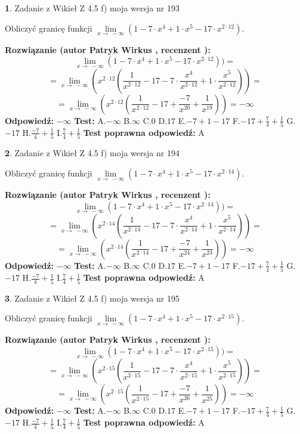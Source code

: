 \documentclass[12pt, a4paper]{article}
\theoremstyle{definition} %
\newtheorem{zad}{}
\newcommand{\zadStart}[1]{\begin{zad}#1\newline}
\newcommand{\zadStop}{\end{zad}}
\newcommand{\rozwStart}[2]{\noindent \textbf{Rozwiązanie (autor #1 , recenzent #2): }\newline}
\newcommand{\rozwStop}{\newline}
\newcommand{\odpStart}{\noindent \textbf{Odpowiedź:}\newline}
\newcommand{\odpStop}{\newline}
\newcommand{\testStart}{\noindent \textbf{Test:}\newline}
\newcommand{\testStop}{\newline}
\newcommand{\kluczStart}{\noindent \textbf{Test poprawna odpowiedź:}\newline}
\newcommand{\kluczStop}{\newline}
\begin{document}
\zadStart{Zadanie z Wikieł Z 4.5 f) moja wersja nr 193}



Obliczyć granicę funkcji  $\lim\limits_{x\to\ -\infty}(1 - 7 \cdot x^{4}+1 \cdot x^{5}- 17 \cdot x^{2\cdot12})$.
\zadStop
\rozwStart{Patryk Wirkus}{}
$$\lim\limits_{x\to\ -\infty}(1 - 7 \cdot x^{4}+1 \cdot x^{5}- 17 \cdot x^{2\cdot12}))=$$
$$=\lim\limits_{x\to\ -\infty}(x^{2\cdot12}(\frac{1}{x^{2\cdot12}}-17 -7 \cdot \frac{x^{4}}{x^{2\cdot12}}+1 \cdot \frac{x^{5}}{x^{2\cdot12}}))=$$
$$=\lim\limits_{x\to\ -\infty}(x^{2\cdot12}(\frac{1}{x^{2\cdot12}}-17 + \frac{-7}{x^{20}}+ \frac{1}{x^{19}}))=-\infty$$
\rozwStop
\odpStart
$-\infty$
\odpStop
\testStart
A.$-\infty$ B.$\infty$ C.$0$ D.$17$ E.$-7 + 1 - 17$
F.$-17+\frac{7}{4}+\frac{1}{5}$ G.$-17$
H.$\frac{-7}{4}+\frac{1}{5}$
I.$\frac{7}{4}+\frac{1}{5}$
\testStop
\kluczStart
A
\kluczStop



\zadStart{Zadanie z Wikieł Z 4.5 f) moja wersja nr 194}



Obliczyć granicę funkcji  $\lim\limits_{x\to\ -\infty}(1 - 7 \cdot x^{4}+1 \cdot x^{5}- 17 \cdot x^{2\cdot14})$.
\zadStop
\rozwStart{Patryk Wirkus}{}
$$\lim\limits_{x\to\ -\infty}(1 - 7 \cdot x^{4}+1 \cdot x^{5}- 17 \cdot x^{2\cdot14}))=$$
$$=\lim\limits_{x\to\ -\infty}(x^{2\cdot14}(\frac{1}{x^{2\cdot14}}-17 -7 \cdot \frac{x^{4}}{x^{2\cdot14}}+1 \cdot \frac{x^{5}}{x^{2\cdot14}}))=$$
$$=\lim\limits_{x\to\ -\infty}(x^{2\cdot14}(\frac{1}{x^{2\cdot14}}-17 + \frac{-7}{x^{24}}+ \frac{1}{x^{23}}))=-\infty$$
\rozwStop
\odpStart
$-\infty$
\odpStop
\testStart
A.$-\infty$ B.$\infty$ C.$0$ D.$17$ E.$-7 + 1 - 17$
F.$-17+\frac{7}{4}+\frac{1}{5}$ G.$-17$
H.$\frac{-7}{4}+\frac{1}{5}$
I.$\frac{7}{4}+\frac{1}{5}$
\testStop
\kluczStart
A
\kluczStop



\zadStart{Zadanie z Wikieł Z 4.5 f) moja wersja nr 195}



Obliczyć granicę funkcji  $\lim\limits_{x\to\ -\infty}(1 - 7 \cdot x^{4}+1 \cdot x^{5}- 17 \cdot x^{2\cdot15})$.
\zadStop
\rozwStart{Patryk Wirkus}{}
$$\lim\limits_{x\to\ -\infty}(1 - 7 \cdot x^{4}+1 \cdot x^{5}- 17 \cdot x^{2\cdot15}))=$$
$$=\lim\limits_{x\to\ -\infty}(x^{2\cdot15}(\frac{1}{x^{2\cdot15}}-17 -7 \cdot \frac{x^{4}}{x^{2\cdot15}}+1 \cdot \frac{x^{5}}{x^{2\cdot15}}))=$$
$$=\lim\limits_{x\to\ -\infty}(x^{2\cdot15}(\frac{1}{x^{2\cdot15}}-17 + \frac{-7}{x^{26}}+ \frac{1}{x^{25}}))=-\infty$$
\rozwStop
\odpStart
$-\infty$
\odpStop
\testStart
A.$-\infty$ B.$\infty$ C.$0$ D.$17$ E.$-7 + 1 - 17$
F.$-17+\frac{7}{4}+\frac{1}{5}$ G.$-17$
H.$\frac{-7}{4}+\frac{1}{5}$
I.$\frac{7}{4}+\frac{1}{5}$
\testStop
\kluczStart
A
\kluczStop
\end{document}
